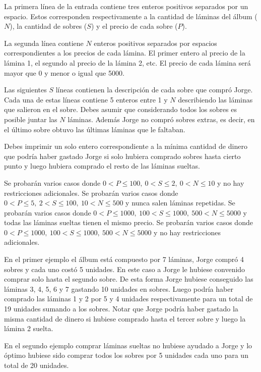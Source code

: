 \documentclass{oci}
\begin{document}
\begin{inputDescription}
La primera línea de la entrada contiene tres enteros positivos separados por un espacio.
Estos corresponden respectivamente a la cantidad de láminas del álbum ($N$), la cantidad de sobres ($S$) y el precio de cada sobre ($P$).

La segunda línea contiene $N$ enteros positivos separados por espacios correspondientes a los precios de cada lámina.
El primer entero al precio de la lámina 1, el segundo al precio de la lámina 2, etc.
El precio de cada lámina será mayor que 0 y menor o igual que 5000.

Las siguientes $S$ líneas contienen la descripción de cada sobre que compró Jorge.
Cada una de estas líneas contiene 5 enteros entre 1 y $N$ describiendo las láminas que salieron en el sobre.
Debes asumir que considerando todos los sobres es posible juntar las $N$ láminas. 
Además Jorge no compró sobres extras, es decir, en el último sobre obtuvo las últimas láminas que le faltaban.
\end{inputDescription}

\begin{outputDescription}
Debes imprimir un solo entero correspondiente a la mínima cantidad de dinero que podría haber gastado Jorge si solo hubiera comprado sobres hasta cierto punto y luego hubiera comprado el resto de las láminas sueltas.
\end{outputDescription}

\begin{scoreDescription}
   Se probarán varios casos donde
 $0 < P \leq 100,\ 0 < S \leq 2,\ 0 < N \leq 10$ y no hay restricciones adicionales.
   Se probarán varios casos donde
 $0<P\leq 5,\ 2 < S \leq 100,\ 10 < N \leq 500$ y nunca salen láminas repetidas.
   Se probarán varios casos donde
$0<P\leq 1000,\ 100 < S \leq 1000,\ 500 < N \leq 5000$ y todas las láminas sueltas tienen el mismo precio.
   Se probarán varios casos donde
$0<P\leq 1000,\ 100 < S \leq 1000,\ 500<N\leq 5000$
y no hay restricciones adicionales.
\end{scoreDescription}

\begin{sampleDescription}

En el primer ejemplo el álbum está compuesto por 7 láminas, Jorge compró 4 sobres y cada uno costó 5 unidades.
En este caso a Jorge le hubiese convenido comprar solo hasta el segundo sobre.
De esta forma Jorge hubiese conseguido las láminas 3, 4, 5, 6 y 7 gastando 10 unidades en sobres.
Luego podría haber comprado las láminas 1 y 2 por 5 y 4 unidades respectivamente para un total de 19 unidades sumando a los sobres.
Notar que Jorge podría haber gastado la misma cantidad de dinero si hubiese comprado hasta el tercer sobre y luego la lámina 2 suelta.

En el segundo ejemplo comprar láminas sueltas no hubiese ayudado a Jorge y lo óptimo hubiese sido comprar todos los sobres por 5 unidades cada uno para un total de 20 unidades.

\end{sampleDescription}
\end{document}
